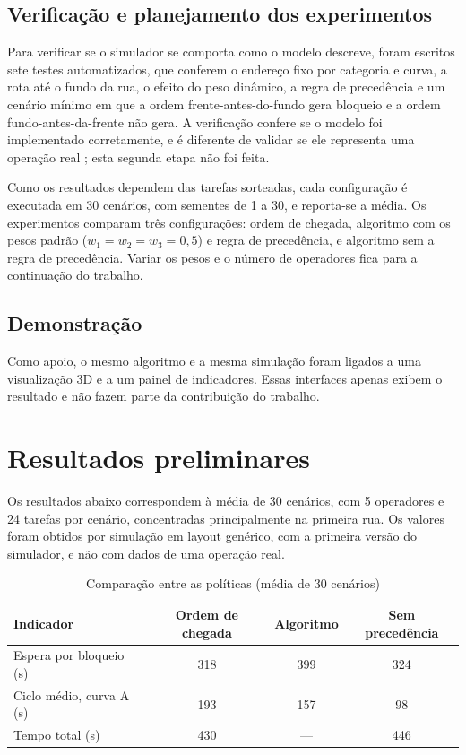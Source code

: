 \documentclass[
	article,
	11pt,
	oneside,
	a4paper,
	english,
	brazil,
	sumario=tradicional
	]{abntex2}
\begin{document}
\subsection{Verificação e planejamento dos experimentos}

Para verificar se o simulador se comporta como o modelo descreve, foram escritos
sete testes automatizados, que conferem o endereço fixo por categoria e curva,
a rota até o fundo da rua, o efeito do peso dinâmico, a regra de precedência e
um cenário mínimo em que a ordem frente-antes-do-fundo gera bloqueio e a ordem
fundo-antes-da-frente não gera. A verificação confere se o modelo foi
implementado corretamente, e é diferente de validar se ele representa uma
operação real \cite{law2000}; esta segunda etapa não foi feita.

Como os resultados dependem das tarefas sorteadas, cada configuração é
executada em 30 cenários, com sementes de 1 a 30, e reporta-se a média. Os
experimentos comparam três configurações: ordem de chegada, algoritmo com os
pesos padrão ($w_1 = w_2 = w_3 = 0{,}5$) e regra de precedência, e algoritmo
sem a regra de precedência. Variar os pesos e o número de operadores fica para
a continuação do trabalho.

\subsection{Demonstração}

Como apoio, o mesmo algoritmo e a mesma simulação foram ligados a uma
visualização 3D e a um painel de indicadores. Essas interfaces apenas exibem o
resultado e não fazem parte da contribuição do trabalho.

\section{Resultados preliminares}
\label{sec:resultados}

Os resultados abaixo correspondem à média de 30 cenários, com 5 operadores e 24
tarefas por cenário, concentradas principalmente na primeira rua. Os valores
foram obtidos por simulação em layout genérico, com a primeira versão do
simulador, e não com dados de uma operação real.

\begin{table}[htb]
	\centering
	\caption{Comparação entre as políticas (média de 30 cenários)}
	\label{tab:resultados}
	\begin{tabular}{lccc}
		\toprule
		Indicador & Ordem de chegada & Algoritmo & Sem precedência \\
		\midrule
		Espera por bloqueio (s) & 318 & 399 & 324 \\
		Ciclo médio, curva A (s) & 193 & 157 & 98 \\
		Tempo total (s) & 430 & --- & 446 \\
		\bottomrule
	\end{tabular}
\end{table}
\end{document}
